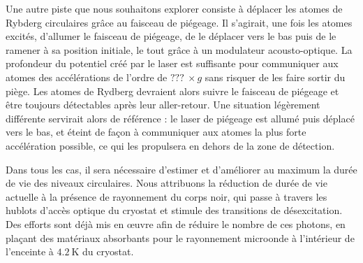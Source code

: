 Une autre piste que nous souhaitons explorer consiste à déplacer les atomes de Rybderg circulaires grâce au faisceau de piégeage.
Il s'agirait, une fois les atomes excités, d'allumer le faisceau de piégeage, de le déplacer vers le bas puis de le ramener à sa position initiale, le tout grâce à un modulateur acousto-optique.
La profondeur du potentiel créé par le laser est suffisante pour communiquer aux atomes des accélérations de l'ordre de $???\SI{}{}\times g$ sans risquer de les faire sortir du piège.
Les atomes de Rydberg devraient alors suivre le faisceau de piégeage et être toujours détectables après leur aller-retour.
Une situation légèrement différente servirait alors de référence : le laser de piégeage est allumé puis déplacé vers le bas, et éteint de façon à communiquer aux atomes la plus forte accélération possible, ce qui les propulsera en dehors de la zone de détection.

Dans tous les cas, il sera nécessaire d'estimer et d'améliorer au maximum la durée de vie des niveaux circulaires.
Nous attribuons la réduction de durée de vie actuelle à la présence de rayonnement du corps noir, qui passe à travers les hublots d'accès optique du cryostat et stimule des transitions de désexcitation.
Des efforts sont déjà mis en \oe uvre afin de réduire le nombre de ces photons, en plaçant des matériaux absorbants pour le rayonnement microonde à l'intérieur de l'enceinte à $\SI{4.2}{\K}$ du cryostat.


